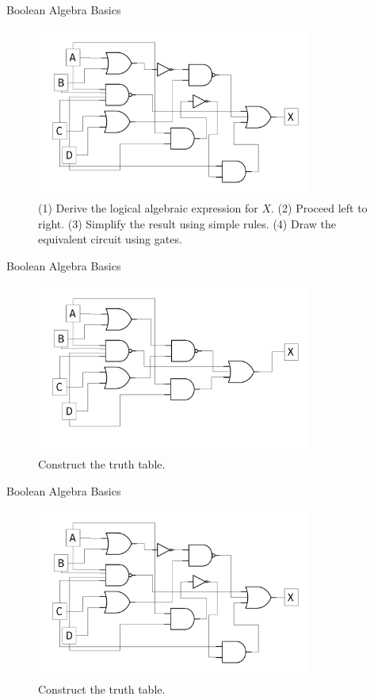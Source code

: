 \documentclass{beamer}
\begin{document}
\begin{frame}{Boolean Algebra Basics}
\begin{figure}
\centering
\includegraphics[width=0.8\textwidth]{figures/MultiGate2.pdf}
\caption{\label{fig:multi2} (1) Derive the logical algebraic expression for $X$.  (2) Proceed left to right.  (3) Simplify the result using simple rules. (4) Draw the equivalent circuit using gates.}
\end{figure}
\end{frame}

\begin{frame}{Boolean Algebra Basics}
\begin{figure}
\centering
\includegraphics[width=0.8\textwidth]{figures/MultiGate1.pdf}
\caption{\label{fig:multi3} Construct the truth table.}
\end{figure}
\end{frame}

\begin{frame}{Boolean Algebra Basics}
\begin{figure}
\centering
\includegraphics[width=0.8\textwidth]{figures/MultiGate2.pdf}
\caption{\label{fig:multi4} Construct the truth table.}
\end{figure}
\end{frame}
\end{document}
